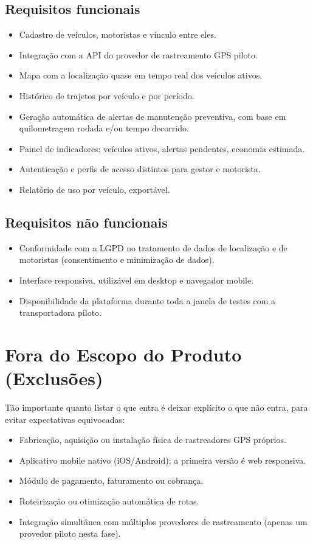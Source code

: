 \documentclass[11pt,a4paper]{article}
\begin{document}
\subsection{Requisitos funcionais}
\begin{itemize}[itemsep=2pt]
  \item Cadastro de veículos, motoristas e vínculo entre eles.
  \item Integração com a API do provedor de rastreamento GPS piloto.
  \item Mapa com a localização quase em tempo real dos veículos ativos.
  \item Histórico de trajetos por veículo e por período.
  \item Geração automática de alertas de manutenção preventiva, com base em quilometragem rodada e/ou tempo decorrido.
  \item Painel de indicadores: veículos ativos, alertas pendentes, economia estimada.
  \item Autenticação e perfis de acesso distintos para gestor e motorista.
  \item Relatório de uso por veículo, exportável.
\end{itemize}

\subsection{Requisitos não funcionais}
\begin{itemize}[itemsep=2pt]
  \item Conformidade com a LGPD no tratamento de dados de localização e de motoristas (consentimento e minimização de dados).
  \item Interface responsiva, utilizável em desktop e navegador mobile.
  \item Disponibilidade da plataforma durante toda a janela de testes com a transportadora piloto.
\end{itemize}

\section{Fora do Escopo do Produto (Exclusões)}
Tão importante quanto listar o que entra é deixar explícito o que não entra, para evitar expectativas equivocadas:
\begin{itemize}[itemsep=2pt]
  \item Fabricação, aquisição ou instalação física de rastreadores GPS próprios.
  \item Aplicativo mobile nativo (iOS/Android); a primeira versão é web responsiva.
  \item Módulo de pagamento, faturamento ou cobrança.
  \item Roteirização ou otimização automática de rotas.
  \item Integração simultânea com múltiplos provedores de rastreamento (apenas um provedor piloto nesta fase).
\end{itemize}
\end{document}
